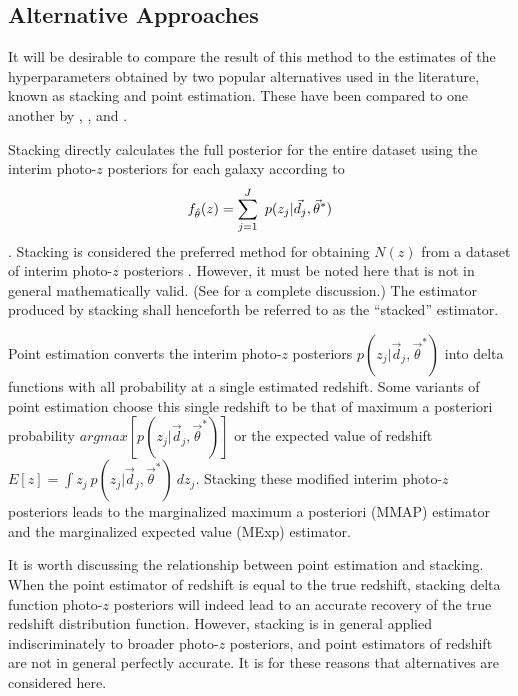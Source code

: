 \subsection{Alternative Approaches}

It will be desirable to compare the result of this method to the estimates of the hyperparameters obtained by two popular alternatives used in the literature, known as stacking and point estimation.   
These have been compared 
to one another by \citet{Hildebrandt2012}, \citet{Benjamin2013}, and \citet{Asorey2016}.

Stacking directly calculates the full posterior for the entire dataset using the interim photo-$z$ posteriors for each galaxy according to 
\begin{equation}
\eqlabel{eq:stack}
f_{\hat{\theta}}(z) = \sum_{j=1}^{J}\ p(z_{j}|\vec{d}_{j},\vec{\theta}^{*})
\end{equation}
\citep{Lima2008}.  
Stacking is considered the preferred method for obtaining $N(z)$ from a dataset of interim photo-$z$ posteriors \citep{Sheldon2012, Kelly2014, Benjamin2013, Bonnett2015a, Viironen2015, Asorey2016}.  
However, it must be noted here that  is not in general mathematically valid.  
(See \citet{Hogg2012} for a complete discussion.)  
The estimator produced by stacking shall henceforth be referred to as the ``stacked'' estimator.

Point estimation converts the interim photo-$z$ posteriors $p(z_{j}|\vec{d}_{j},\vec{\theta}^{*})$ into delta functions with all probability at a single estimated redshift.  
Some variants of point estimation choose this single redshift to be that of maximum a posteriori probability $argmax[p(z_{j}|\vec{d}_{j},\vec{\theta}^{*})]$ or the expected value of redshift $E[z]=\int z_{j}\ p(z_{j}|\vec{d}_{j},\vec{\theta}^{*})\ dz_{j}$.  
Stacking these modified interim photo-$z$ posteriors leads to the marginalized maximum a posteriori (MMAP) estimator and the marginalized expected value (MExp) estimator.

It is worth discussing the relationship between point estimation and stacking.  
When the point estimator of redshift is equal to the true redshift, stacking delta function photo-$z$ posteriors will indeed lead to an accurate recovery of the true redshift distribution function.  
However, stacking is in general applied indiscriminately to broader photo-$z$ posteriors, and point estimators of redshift are not in general perfectly accurate.  
It is for these reasons that alternatives are considered here.

